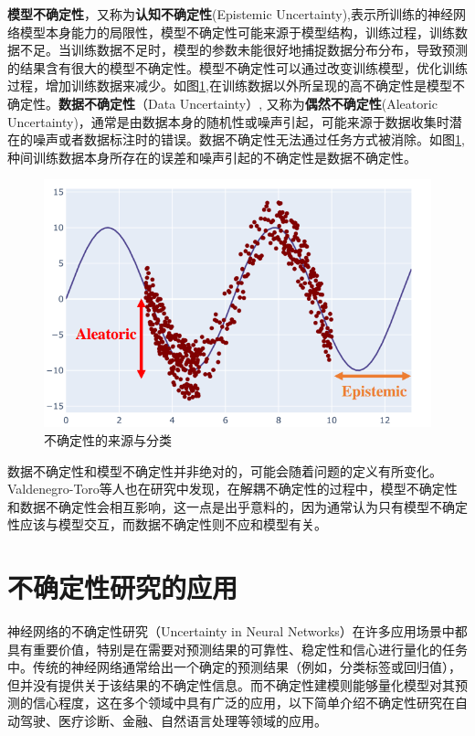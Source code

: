 \textbf{模型不确定性}，又称为\textbf{认知不确定性}(Epistemic Uncertainty),表示所训练的神经网络模型本身能力的局限性，模型不确定性可能来源于模型结构，训练过程，训练数据不足。当训练数据不足时，模型的参数未能很好地捕捉数据分布分布，导致预测的结果含有很大的模型不确定性。模型不确定性可以通过改变训练模型，优化训练过程，增加训练数据来减少。如图\ref{fig:uncertainty},在训练数据以外所呈现的高不确定性是模型不确定性。\textbf{数据不确定性}（Data Uncertainty）, 又称为\textbf{偶然不确定性}(Aleatoric Uncertainty)，通常是由数据本身的随机性或噪声引起，可能来源于数据收集时潜在的噪声或者数据标注时的错误。数据不确定性无法通过任务方式被消除。如图\ref{fig:uncertainty},种间训练数据本身所存在的误差和噪声引起的不确定性是数据不确定性。

\begin{figure}[H]
    \centering
    \includegraphics[width=0.9\linewidth]{assets/1-1.png}
    \caption{不确定性的来源与分类\cite{abdar2021review}
}
    \label{fig:uncertainty}
\end{figure}

数据不确定性和模型不确定性并非绝对的，可能会随着问题的定义有所变化\cite{hullermeier2021aleatoric}。Valdenegro-Toro等人\cite{valdenegro2022deeper}也在研究中发现，在解耦不确定性的过程中，模型不确定性和数据不确定性会相互影响，这一点是出乎意料的，因为通常认为只有模型不确定性应该与模型交互，而数据不确定性则不应和模型有关。



\section{不确定性研究的应用}
神经网络的不确定性研究（Uncertainty in Neural Networks）在许多应用场景中都具有重要价值，特别是在需要对预测结果的可靠性、稳定性和信心进行量化的任务中。传统的神经网络通常给出一个确定的预测结果（例如，分类标签或回归值），但并没有提供关于该结果的不确定性信息。而不确定性建模则能够量化模型对其预测的信心程度，这在多个领域中具有广泛的应用，以下简单介绍不确定性研究在自动驾驶、医疗诊断、金融、自然语言处理等领域的应用。

